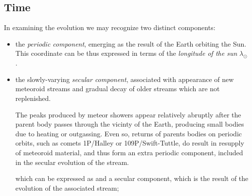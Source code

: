     \subsection{Time} \label{i}
        In examining the evolution we may recognize two distinct components:
        \begin{itemize}
            \item the \emph{periodic component}, emerging as the result of the Earth orbiting the Sun.
                This coordinate can be thus expressed in terms of the \emph{longitude of the sun} $\lambda_\odot$.

            \item the slowly-varying \emph{secular component}, associated with appearance of new meteoroid streams and gradual decay of older
                streams which are not replenished.

                The peaks produced by meteor showers appear relatively abruptly after the parent body passes through the vicinty of the Earth,
                producing small bodies due to heating or outgassing.
                Even so, returns of parents bodies on periodic orbits, such as comets 1P/Halley or 109P/Swift-Tuttle, do result
                in resupply of meteoroid material, and thus form an extra periodic component, included in the secular evolution of the stream.

            
        which can be expressed as and a secular component, which is the result
        of the evolution of the associated stream;

        \end{itemize}
